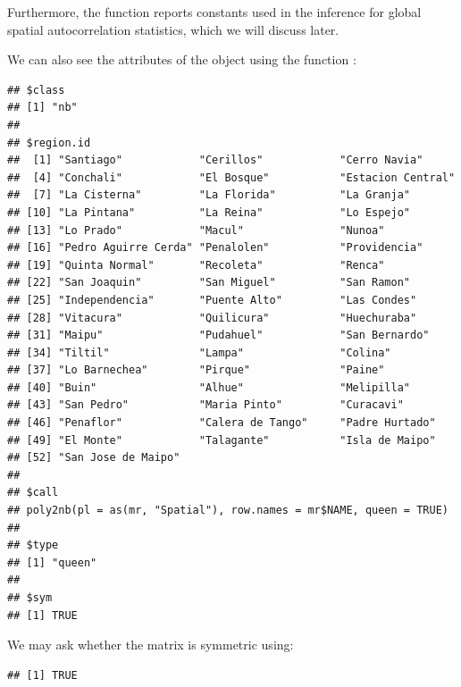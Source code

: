 Furthermore, the  function reports constants used in the inference for global spatial autocorrelation statistics, which we will discuss later. 

We can also see the attributes of the object using the function :


\begin{knitrout}
\color{fgcolor}\begin{kframe}
\begin{alltt}
\end{alltt}
\begin{verbatim}
## $class
## [1] "nb"
## 
## $region.id
##  [1] "Santiago"            "Cerillos"            "Cerro Navia"        
##  [4] "Conchali"            "El Bosque"           "Estacion Central"   
##  [7] "La Cisterna"         "La Florida"          "La Granja"          
## [10] "La Pintana"          "La Reina"            "Lo Espejo"          
## [13] "Lo Prado"            "Macul"               "Nunoa"              
## [16] "Pedro Aguirre Cerda" "Penalolen"           "Providencia"        
## [19] "Quinta Normal"       "Recoleta"            "Renca"              
## [22] "San Joaquin"         "San Miguel"          "San Ramon"          
## [25] "Independencia"       "Puente Alto"         "Las Condes"         
## [28] "Vitacura"            "Quilicura"           "Huechuraba"         
## [31] "Maipu"               "Pudahuel"            "San Bernardo"       
## [34] "Tiltil"              "Lampa"               "Colina"             
## [37] "Lo Barnechea"        "Pirque"              "Paine"              
## [40] "Buin"                "Alhue"               "Melipilla"          
## [43] "San Pedro"           "Maria Pinto"         "Curacavi"           
## [46] "Penaflor"            "Calera de Tango"     "Padre Hurtado"      
## [49] "El Monte"            "Talagante"           "Isla de Maipo"      
## [52] "San Jose de Maipo"  
## 
## $call
## poly2nb(pl = as(mr, "Spatial"), row.names = mr$NAME, queen = TRUE)
## 
## $type
## [1] "queen"
## 
## $sym
## [1] TRUE
\end{verbatim}
\end{kframe}
\end{knitrout}

We may ask whether the matrix is symmetric using:

\begin{knitrout}
\color{fgcolor}\begin{kframe}
\begin{alltt}
\end{alltt}
\begin{verbatim}
## [1] TRUE
\end{verbatim}
\end{kframe}
\end{knitrout}

